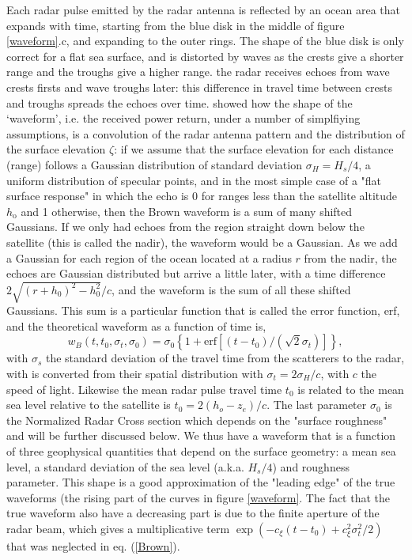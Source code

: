 Each radar pulse emitted by the radar antenna is  reflected by an ocean area that expands with time, starting from the blue disk in the middle of figure \ref{waveform}.c, and 
expanding to the outer rings. The shape of the blue disk is only correct for a flat sea surface, and is distorted by waves as the crests give a shorter range and the troughs give a higher range. 
the radar receives echoes from wave crests firsts and wave troughs later: this difference in travel time between crests and troughs  
spreads the echoes over time. \cite{Brown1977} showed how the shape of the `waveform',  i.e. the received power return, under a number 
of simplfiying assumptions, is a convolution 
of the radar antenna pattern and the distribution of the surface elevation $\zeta$: if we assume that the surface elevation for each 
distance (range) follows a Gaussian distribution of standard deviation $\sigma_H=H_s/4$, a uniform distribution of specular points, and in the most simple case of a "flat surface response" in which the echo is 0 for ranges less than the satellite altitude $h_{\mathrm{o}}$ and 1 otherwise, then the Brown waveform is a sum of many shifted Gaussians. If we only had echoes from the region straight down below the satellite (this is called the nadir), the waveform would be a Gaussian. As we add a Gaussian for each region of the ocean located at a radius $r$ from the nadir, the echoes are Gaussian distributed but arrive a little later, with a time difference $2 \sqrt{(r+h_0)^2-h_0^2}/c$, and the waveform is the sum of all these shifted Gaussians.  This sum is a particular function that is called the error function, erf, and the  theoretical waveform as a function of time is, 
\begin{equation}
    w_B(t,t_0,\sigma_t,\sigma_0)=  \sigma_0 \left\{ 1+ \mathrm{erf}\left[(t-t_0)/( \sqrt{2} \sigma_t) \right] \right\}, \label{Brown}
\end{equation}
with $\sigma_s$ the standard deviation of the travel time from the scatterers to the radar, with is converted from their spatial distribution with $\sigma_t= 2 \sigma_H / c$, with $c$ the speed of light. Likewise the mean radar pulse travel time $t_0$ is related to the mean sea level relative to the satellite is $t_0=2(h_o- z_e)/c$. The last parameter $ \sigma_0$ is the Normalized Radar Cross section which depends on the "surface roughness" and will be further discussed below. We thus have a waveform that is a function of three geophysical quantities that depend on the surface geometry: a mean sea level, a standard deviation of the sea level (a.k.a. $H_s/4$) and roughness parameter. This shape is a good approximation of the "leading edge" of the true waveforms (the rising part of the curves in figure \ref{waveform}. The fact that the true waveform also have a decreasing part is due to the finite aperture of the 
radar beam, which gives a multiplicative term $\exp(-c_\xi (t-t_0)+c_\xi^2 \sigma_t^2/2)$ that was neglected in eq. (\ref{Brown}).  %


